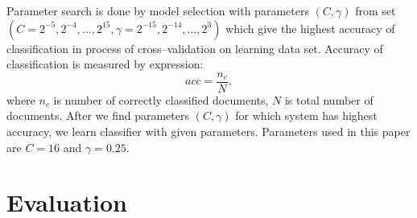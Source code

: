 \documentclass[11pt,english]{article}
\newcommand{\engl}[1]{(engl.~\emph{#1})}
\begin{document}
\begin{multicols}{2}

Parameter search is done by model selection with parameters $(C, \gamma)$ from
set $\left (C = {2^{-5}, 2^{-4}, \ldots , 2^{15}},  \gamma = {2^{-15}, 2^{-14},
\ldots, 2^3} \right )$ \citep{CC01a} which give the highest accuracy of
classification in process of cross--validation on learning data set. Accuracy
of classification is measured by expression:
\begin{equation}
acc = \frac{n_c}{N},
\end{equation}
where $n_c$ is number of correctly classified documents, $N$ is total number of
documents. After we find parameters $(C, \gamma)$ for which system has highest
accuracy, we learn classifier with given parameters. Parameters used in this
paper are $C = 16$ and $\gamma = 0.25$.


\section{Evaluation}
\label{sec:evaluacija}


\end{multicols}
\end{document}
